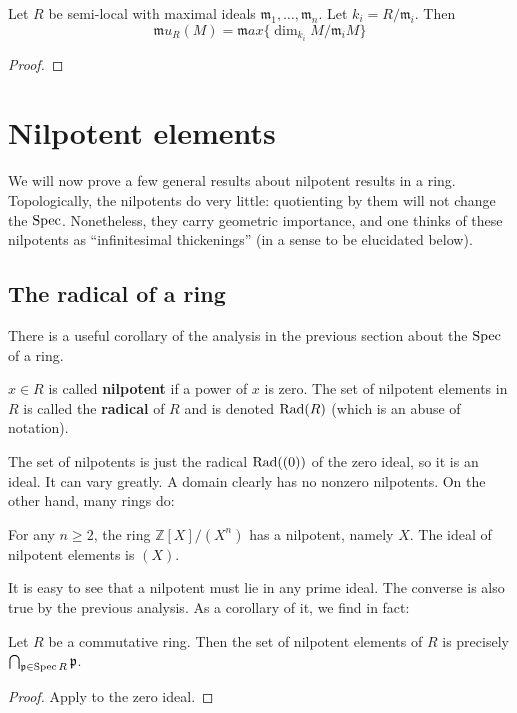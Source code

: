 \begin{theorem}
Let $R$ be semi-local with maximal ideals $\mathfrak{m}_1,\dots,
\mathfrak{m}_n$. Let $k_i = R/\mathfrak{m}_i$. Then
   \[
     \mathfrak{m}u_R(M) = \mathfrak{m}ax \{\dim_{k_i} M/\mathfrak{m}_i M\}
   \]
 \end{theorem}
\begin{proof} 
\end{proof} 

\section{Nilpotent elements}

We will now prove a few general results about nilpotent results in a ring.
Topologically, the nilpotents do very little: quotienting by them will not
change the $\operatorname{Spec}$. Nonetheless, they carry geometric importance, and one
thinks of these nilpotents as ``infinitesimal thickenings'' (in a sense to be
elucidated below).

\subsection{The radical of a ring}
There is a useful corollary of the analysis in the previous section about the
$\operatorname{Spec}$ of a ring.

\begin{definition} 
 $x \in R$ is called \textbf{nilpotent} if a power of $x$ is zero. The set of
 nilpotent elements in $R$ is called the \textbf{radical} of $R$ and is denoted
 $\operatorname{Rad}(R)$ (which is an abuse of notation).
\end{definition}

The set of nilpotents is just the radical $\operatorname{Rad}((0))$ of the zero ideal, so it
is an ideal. It can vary greatly. 
A domain clearly has no nonzero nilpotents. On the other hand, many rings do:

\begin{example} 
For any $n \geq 2$, the ring $\mathbb{Z}[X]/(X^n)$ has a nilpotent, namely $X$.
The ideal of nilpotent elements is $(X)$.
\end{example} 

It is easy to see that a nilpotent must lie in any prime ideal. The converse
is also true by the previous analysis.
As a corollary of it, we find in fact:

\begin{corollary} \label{nilradicalisprimes}
Let $R$ be a commutative ring. Then the set of nilpotent elements of $R$ is
precisely $\bigcap_{\mathfrak{p} \in \operatorname{Spec} R} \mathfrak{p}$.
\end{corollary} 
\begin{proof} 
Apply  to the zero ideal.
\end{proof} 

